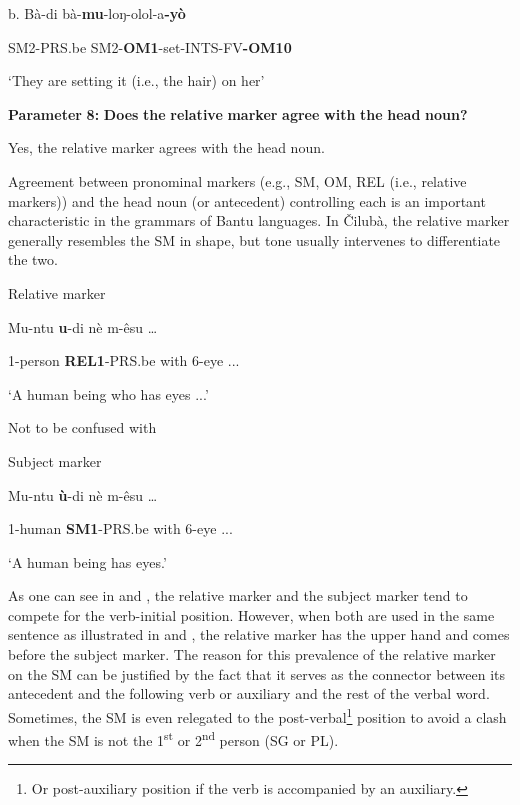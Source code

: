 \documentclass[output=paper]{langscibook}
\begin{document}
b.   Bà-di        bà-\textbf{mu}{}-loŋ-olol-a\textbf{{}-yò}

      SM2-PRS.be  SM2-\textbf{OM1}{}-set-INTS-FV\textbf{{}-OM10}

\glt ‘They are setting it (i.e., the hair) on her’

\textbf{Parameter} \textbf{8:} \textbf{Does} \textbf{the} \textbf{relative} \textbf{marker} \textbf{agree} \textbf{with} \textbf{the} \textbf{head} \textbf{noun?}

Yes, the relative marker agrees with the head noun.

Agreement between pronominal markers (e.g., SM, OM, REL (i.e., relative markers)) and the head noun (or antecedent) controlling each is an important characteristic in the grammars of Bantu languages. In Čilubà, the relative marker generally resembles the SM in shape, but tone usually intervenes to differentiate the two.

\ea%
    \label{ex:lukusa:60}
    \z

          Relative marker

Mu-ntu    \textbf{u}{}-di        nè      m-êsu … 

    1-person  \textbf{REL1}{}-PRS.be  with    6-eye ...

\glt ‘A human being who has eyes ...’

Not to be confused with

\ea%
    \label{ex:lukusa:61}
    \z

          Subject marker

Mu-ntu    \textbf{ù}{}-di        nè    m-êsu … 

1-human  \textbf{SM1}{}-PRS.be  with  6-eye ...

\glt ‘A human being has eyes.’

As one can see in  and , the relative marker and the subject marker tend to compete for the verb-initial position. However, when both are used in the same sentence as illustrated in  and , the relative marker has the upper hand and comes before the subject marker. The reason for this prevalence of the relative marker on the SM can be justified by the fact that it serves as the connector between its antecedent and the following verb or auxiliary and the rest of the verbal word. Sometimes, the SM is even relegated to the post-verbal\footnote{Or post-auxiliary position if the verb is accompanied by an auxiliary.} position to avoid a clash when the SM is not the 1\textsuperscript{st} or 2\textsuperscript{nd} person (SG or PL).
\end{document}
